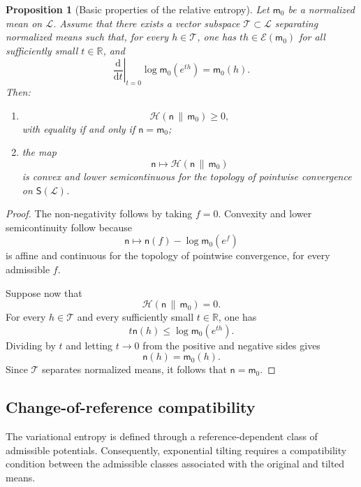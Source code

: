 \documentclass[10pt,a4paper]{amsart}
\newtheorem{Proposition}[Theorem]{Proposition}
\begin{document}
\begin{Proposition}[Basic properties of the relative entropy]
\label{prop:entropy-properties}
Let $\mathsf m_0$ be a normalized mean on $\mathcal L$. Assume that
there exists a vector subspace $\mathcal T\subset\mathcal L$ separating
normalized means such that, for every $h\in\mathcal T$, one has
$th\in\mathcal E(\mathsf m_0)$ for all sufficiently small
$t\in\mathbb R$, and
\[
\left.\frac{\mathrm d}{\mathrm dt}\right|_{t=0}
\log\mathsf m_0(e^{th})
=
\mathsf m_0(h).
\]
Then:
\begin{enumerate}
\item
\[
\mathcal H(\mathsf n\,\|\,\mathsf m_0)\geq 0,
\]
with equality if and only if $\mathsf n=\mathsf m_0$;
\item the map
\[
\mathsf n\longmapsto
\mathcal H(\mathsf n\,\|\,\mathsf m_0)
\]
is convex and lower semicontinuous for the topology of pointwise
convergence on $\mathsf S(\mathcal L)$.
\end{enumerate}
\end{Proposition}

\begin{proof}
The non-negativity follows by taking $f=0$. Convexity and lower
semicontinuity follow because
\[
\mathsf n\longmapsto
\mathsf n(f)-\log\mathsf m_0(e^f)
\]
is affine and continuous for the topology of pointwise convergence, for
every admissible $f$.

Suppose now that
\[
\mathcal H(\mathsf n\,\|\,\mathsf m_0)=0.
\]
For every $h\in\mathcal T$ and every sufficiently small
$t\in\mathbb R$, one has
\[
t\mathsf n(h)
\leq
\log\mathsf m_0(e^{th}).
\]
Dividing by $t$ and letting $t\to0$ from the positive and negative sides
gives
\[
\mathsf n(h)=\mathsf m_0(h).
\]
Since $\mathcal T$ separates normalized means, it follows that
$\mathsf n=\mathsf m_0$.
\end{proof}

\subsection{Change-of-reference compatibility}

The variational entropy is defined through a reference-dependent class
of admissible potentials. Consequently, exponential tilting requires a
compatibility condition between the admissible classes associated with
the original and tilted means.
\end{document}
